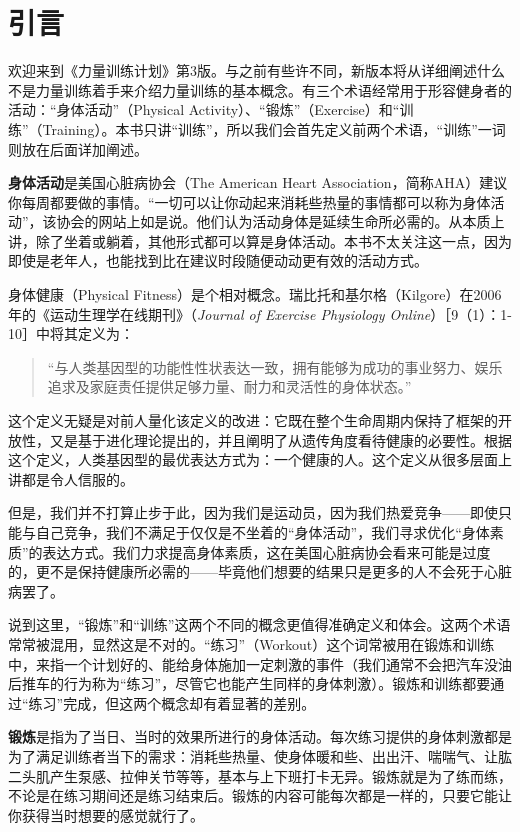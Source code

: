 \chapter{引言}

欢迎来到《力量训练计划》第3版。与之前有些许不同，新版本将从详细阐述什么不是力量训练着手来介绍力量训练的基本概念。有三个术语经常用于形容健身者的活动：“身体活动”（Physical Activity）、“锻炼”（Exercise）和“训练”（Training）。本书只讲“训练”，所以我们会首先定义前两个术语，“训练”一词则放在后面详加阐述。

\textbf{身体活动}是美国心脏病协会（The American Heart Association，简称AHA）建议你每周都要做的事情。“一切可以让你动起来消耗些热量的事情都可以称为身体活动”，该协会的网站上如是说。他们认为活动身体是延续生命所必需的。从本质上讲，除了坐着或躺着，其他形式都可以算是身体活动。本书不太关注这一点，因为即使是老年人，也能找到比在建议时段随便动动更有效的活动方式。

身体健康（Physical Fitness）是个相对概念。瑞比托和基尔格（Kilgore）在2006年的《运动生理学在线期刊》（\textit{Journal of Exercise Physiology Online}）［9（1）：1-10］中将其定义为：

\begin{quote}
    “与人类基因型的功能性性状表达一致，拥有能够为成功的事业努力、娱乐追求及家庭责任提供足够力量、耐力和灵活性的身体状态。”
\end{quote}

这个定义无疑是对前人量化该定义的改进：它既在整个生命周期内保持了框架的开放性，又是基于进化理论提出的，并且阐明了从遗传角度看待健康的必要性。根据这个定义，人类基因型的最优表达方式为：一个健康的人。这个定义从很多层面上讲都是令人信服的。

但是，我们并不打算止步于此，因为我们是运动员，因为我们热爱竞争——即使只能与自己竞争，我们不满足于仅仅是不坐着的“身体活动”，我们寻求优化“身体素质”的表达方式。我们力求提高身体素质，这在美国心脏病协会看来可能是过度的，更不是保持健康所必需的——毕竟他们想要的结果只是更多的人不会死于心脏病罢了。

说到这里，“锻炼”和“训练”这两个不同的概念更值得准确定义和体会。这两个术语常常被混用，显然这是不对的。“练习”（Workout）这个词常被用在锻炼和训练中，来指一个计划好的、能给身体施加一定刺激的事件（我们通常不会把汽车没油后推车的行为称为“练习”，尽管它也能产生同样的身体刺激）。锻炼和训练都要通过“练习”完成，但这两个概念却有着显著的差别。

\textbf{锻炼}是指为了当日、当时的效果所进行的身体活动。每次练习提供的身体刺激都是为了满足训练者当下的需求：消耗些热量、使身体暖和些、出出汗、喘喘气、让肱二头肌产生泵感、拉伸关节等等，基本与上下班打卡无异。锻炼就是为了练而练，不论是在练习期间还是练习结束后。锻炼的内容可能每次都是一样的，只要它能让你获得当时想要的感觉就行了。

